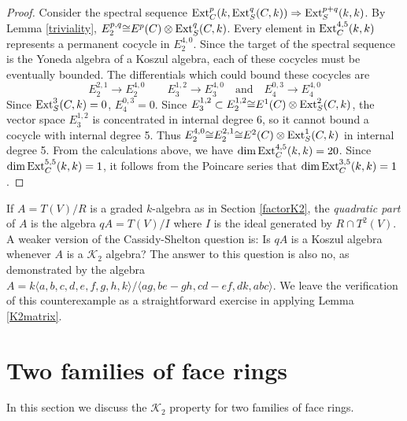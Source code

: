 \documentclass[11pt,righttag]{amsart}
\begin{document}
\begin{example}
\begin{proof}
Consider the spectral sequence ${\hbox{{\rm Ext}}}_C^p(k,{\hbox{{\rm Ext}}}_S^q(C,k))\Rightarrow {\hbox{{\rm Ext}}}_S^{p+q}(k,k)$. By Lemma \ref{triviality}, $E_2^{p,q}{\cong} E^p(C)\otimes {\hbox{{\rm Ext}}}_S^q(C,k)$. 
Every element in ${\hbox{{\rm Ext}}}_C^{4,5}(k,k)$ represents a permanent cocycle in $E_2^{4,0}$. 
Since the target of the spectral sequence is the Yoneda algebra of a Koszul algebra, each of these cocycles must be eventually bounded. The differentials which could bound these cocycles are
$$E_2^{2,1}\rightarrow E_2^{4,0}\qquad E_3^{1,2}\rightarrow E_3^{4,0}\quad \text{and}\quad E_4^{0,3}\rightarrow E_4^{4,0}$$
Since ${\hbox{{\rm Ext}}}_S^3(C,k)=0$, $E_4^{0,3}=0$. Since $E_3^{1,2}\subset E_2^{1,2}{\cong} E^1(C)\otimes {\hbox{{\rm Ext}}}_S^2(C,k)$, the vector space $E_3^{1,2}$ is concentrated in internal degree 6, so it cannot bound a cocycle with internal degree 5. Thus $E_2^{4,0}{\cong} E_2^{2,1}{\cong} E^2(C)\otimes {\hbox{{\rm Ext}}}_S^1(C,k)$ in internal degree 5. From the calculations above, we have $\dim {\hbox{{\rm Ext}}}_C^{4,5}(k,k) = 20$. Since $\dim {\hbox{{\rm Ext}}}_C^{5,5}(k,k)=1$, it follows from the Poincare series that $\dim {\hbox{{\rm Ext}}}_C^{3,5}(k,k)=1$.

\end{proof}

 \end{example}

\begin{rmk}
If $A=T(V)/R$ is a graded $k$-algebra as in Section \ref{factorK2}, the \emph{quadratic part} of $A$ is the algebra $qA=T(V)/I$ where $I$ is the ideal generated by $R\cap T^2(V)$. A weaker version of the Cassidy-Shelton question is: Is $qA$ is a Koszul algebra whenever $A$ is a ${{\mathcal K}}_2$ algebra? The answer to this question is also no, as demonstrated by the algebra $A=k{\langle} a,b,c,d,e,f,g,h,k{\rangle}/{\langle} ag, be-gh, cd-ef, dk, abc{\rangle}$. We leave the verification of this counterexample as a straightforward exercise in applying Lemma \ref{K2matrix}.

\end{rmk}

\bigskip

\section{Two families of face rings}
\label{families}

In this section we discuss the ${{\mathcal K}}_2$ property for two families of face rings.
\end{document}
